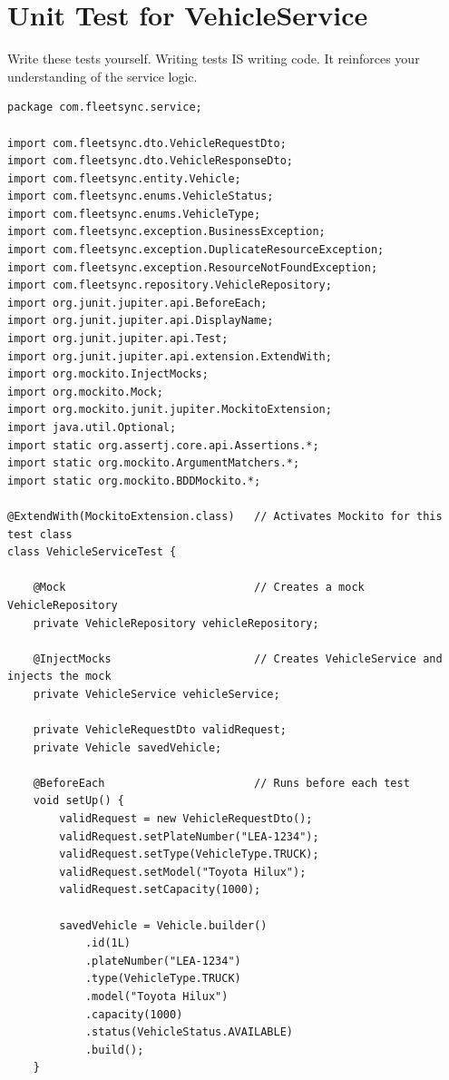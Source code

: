 \documentclass[12pt,a4paper]{report}
\begin{document}
\section{Unit Test for VehicleService}

\begin{tcolorbox}[handbox]
Write these tests yourself. Writing tests IS writing code. It reinforces your understanding of the service logic.
\end{tcolorbox}

\begin{lstlisting}[caption=VehicleServiceTest.java -- Unit Tests with Mockito]
package com.fleetsync.service;

import com.fleetsync.dto.VehicleRequestDto;
import com.fleetsync.dto.VehicleResponseDto;
import com.fleetsync.entity.Vehicle;
import com.fleetsync.enums.VehicleStatus;
import com.fleetsync.enums.VehicleType;
import com.fleetsync.exception.BusinessException;
import com.fleetsync.exception.DuplicateResourceException;
import com.fleetsync.exception.ResourceNotFoundException;
import com.fleetsync.repository.VehicleRepository;
import org.junit.jupiter.api.BeforeEach;
import org.junit.jupiter.api.DisplayName;
import org.junit.jupiter.api.Test;
import org.junit.jupiter.api.extension.ExtendWith;
import org.mockito.InjectMocks;
import org.mockito.Mock;
import org.mockito.junit.jupiter.MockitoExtension;
import java.util.Optional;
import static org.assertj.core.api.Assertions.*;
import static org.mockito.ArgumentMatchers.*;
import static org.mockito.BDDMockito.*;

@ExtendWith(MockitoExtension.class)   // Activates Mockito for this test class
class VehicleServiceTest {

    @Mock                             // Creates a mock VehicleRepository
    private VehicleRepository vehicleRepository;

    @InjectMocks                      // Creates VehicleService and injects the mock
    private VehicleService vehicleService;

    private VehicleRequestDto validRequest;
    private Vehicle savedVehicle;

    @BeforeEach                       // Runs before each test
    void setUp() {
        validRequest = new VehicleRequestDto();
        validRequest.setPlateNumber("LEA-1234");
        validRequest.setType(VehicleType.TRUCK);
        validRequest.setModel("Toyota Hilux");
        validRequest.setCapacity(1000);

        savedVehicle = Vehicle.builder()
            .id(1L)
            .plateNumber("LEA-1234")
            .type(VehicleType.TRUCK)
            .model("Toyota Hilux")
            .capacity(1000)
            .status(VehicleStatus.AVAILABLE)
            .build();
    }


\end{lstlisting}
\end{document}
